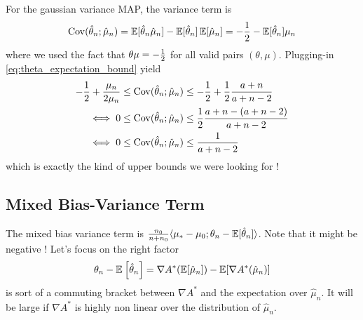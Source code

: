 \documentclass{article}
\newcommand*{\expect}[2][]{\ensuremath{\mathbb{E}_{#1} \left[ #2 \right] }} %
\newcommand{\logpart}{A}
\newcommand{\conj}{\logpart^*}
\newcommand{\nat}{\theta}
\newcommand{\MAPm}{\hat \mu_n}
\newcommand{\MAPt}{\hat \nat_n}
\begin{document}
\begin{example}
	For the gaussian variance MAP, the variance term is
		\begin{align}
			\Cov(\hat \nat_n ; \hat \mu_n )  
			= \E[\MAPt \MAPm] - \E[\MAPt] \E[\MAPm] 
			=  - \half - \E[\MAPt] \mu_n
	\end{align}
	where we used the fact that $\nat \mu = -\half$ for all valid pairs $(\nat, \mu)$. 
	Plugging-in \eqref{eq:theta_expectation_bound} yield
	\begin{align}
		-\half + \frac{\mu_n}{2 \mu_n}
		&\leq \Cov(\hat \nat_n ; \hat \mu_n ) 
		\leq -\half + \half \frac{a + n}{a + n - 2} \\
		\iff 0&\leq \Cov(\hat \nat_n ; \hat \mu_n ) 
		\leq \half \frac{a+n - (a + n -2)}{a + n - 2} \\
		\iff 0&\leq \Cov(\hat \nat_n ; \hat \mu_n ) 
		\leq \inv{a +n - 2}
	\end{align}
	which is exactly the kind of upper bounds we were looking for !
\end{example}

\subsection{Mixed Bias-Variance Term}
The mixed bias variance term is $ \frac{n_0}{n+n_0} \langle  {\mu_* - \mu_0} ; {\nat_n - \E[\hat \nat_n]} \rangle $.
Note that it might be negative !
Let's focus on the right factor
\begin{align}
\theta_n - \expect{\hat \theta_n} = \nabla \conj(\E[\hat \mu_n]) - \E[\nabla \conj(\hat \mu_n)]
\end{align}
is sort of a commuting bracket between $\nabla \conj$ and the expectation over $\hat \mu_n$. It will be large if $\nabla \conj$ is highly non linear over the distribution of $\hat \mu_n$.
\end{document}
